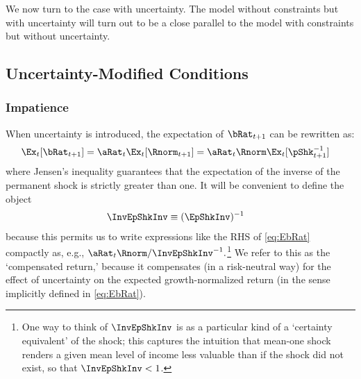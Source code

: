 \documentclass[BufferStockTheory]{subfiles}
\begin{document}
\providecommand{\figName}{RelatePFGICFHWCRICPFFVAC} %
\providecommand{\figFile}{\figName} %
\hypertarget{\figName}{}

We now turn to the case with uncertainty.  The model without constraints but with uncertainty will turn out to be a close parallel to the model with constraints but without uncertainty.

\hypertarget{Uncertainty-Modified-Conditions}{}
\subsection{Uncertainty-Modified Conditions}\label{subsec:UncertaintyModifiedConditions}
\subsubsection{Impatience}

When uncertainty is introduced, the expectation of $\bRat_{t+1}$ can be rewritten as:  
\begin{align}
  \Ex_{t}[\bRat_{t+1}]  & =  \aRat_{t}\Ex_{t}[\Rnorm_{t+1}] = \aRat_{t}\Rnorm\Ex_{t}[\pShk_{t+1}^{-1}] \label{eq:EbRat}
\end{align}
where Jensen's inequality guarantees that the expectation of the inverse of the permanent shock is strictly greater than one.  It will be convenient to define the object \hypertarget{InvEpShkInv}{}
\begin{align*}
  \InvEpShkInv  & \equiv  (\EpShkInv)^{-1}
\end{align*}
because this permits us to write expressions like the RHS of
\eqref{eq:EbRat} compactly as, e.g., $\aRat_{t}\Rnorm/
\InvEpShkInv^{-1}.$\footnote{One way to think of $\InvEpShkInv$ is as
  a particular kind of a `certainty equivalent' of the shock; this
  captures the intuition that mean-one shock renders a given mean
  level of income less valuable than if the shock did not exist, so
  that $\InvEpShkInv < 1$.}  We refer to this as the `compensated return,' because it compensates (in a risk-neutral way) for the effect of
uncertainty on the expected growth-normalized return (in the sense implicitly defined in
\eqref{eq:EbRat}).
\end{document}
